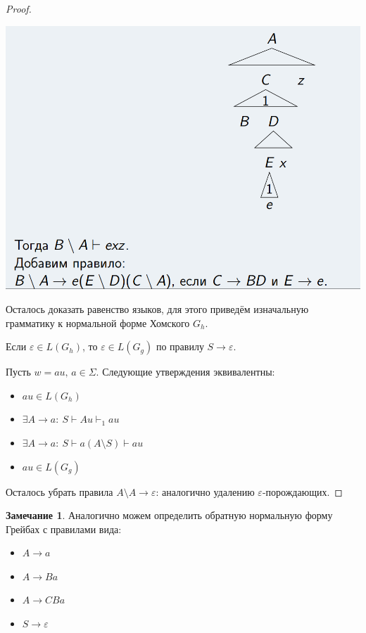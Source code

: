 \documentclass[a4paper,12pt]{article}
\theoremstyle{plain}
\theoremstyle{definition}
\newtheorem*{note}{Замечание}
\theoremstyle{remark}
\begin{document}
\begin{proof}
\begin{itemize}
		      \includegraphics[scale=0.3]{assets/greibach.png}
	\end{itemize}

	Осталось доказать равенство языков, для этого приведём изначальную грамматику к нормальной форме Хомского $G_h$.

	Если $\varepsilon \in L(G_h)$, то $\varepsilon \in L(G_g)$ по правилу $S \to \varepsilon$.

	Пусть $w = au,\, a \in \Sigma$. Следующие утверждения эквивалентны:
	\begin{itemize}
		\item $au \in L(G_h)$
		\item $\exists A \to a :\: S \vdash Au \vdash_1 au$
		\item $\exists A \to a :\: S \vdash a(A \setminus S) \vdash au$
		\item $au \in L(G_g)$
	\end{itemize}
	Осталось убрать правила $A \setminus A \to \varepsilon$: аналогично удалению $\varepsilon$-порождающих.
\end{proof}

\begin{note}
	Аналогично можем определить обратную нормальную форму Грейбах с правилами вида:
	\begin{itemize}
		\item $A \to a$
		\item $A \to Ba$
		\item $A \to CBa$
		\item $S \to \varepsilon$
	\end{itemize}
\end{note}
\end{document}
